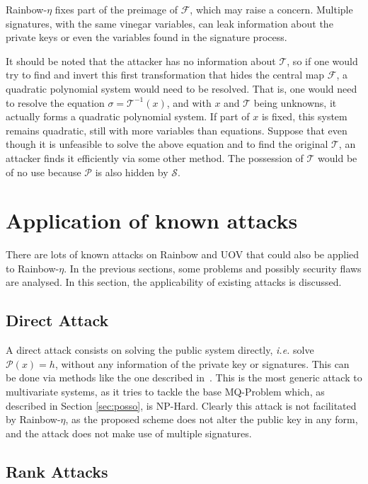 \documentclass{ufsctex/ufsctex}
\begin{document}
Rainbow-$\eta$ fixes part of the preimage of $\mathcal{F}$, which may raise a
concern. Multiple signatures, with the same vinegar variables, can leak
information about the private keys or even the variables found in the signature
process.

It should be noted that the attacker has no information about $\mathcal{T}$, so
if one would try to find and invert this first transformation that hides the
central map $\mathcal{F}$, a quadratic polynomial system would need to be
resolved. That is, one would need to resolve the equation $\sigma =
\mathcal{T}^{-1}(x)$, and with $x$ and $\mathcal{T}$ being unknowns, it
actually forms a quadratic polynomial system. If part of $x$ is fixed, this
system remains quadratic, still with more variables than equations. Suppose
that even though it is unfeasible to solve the above equation and to find the
original $\mathcal{T}$, an attacker finds it efficiently via some other method.
The possession of $\mathcal{T}$ would be of no use because $\mathcal{P}$ is
also hidden by $\mathcal{S}$.

\section{Application of known attacks}

There are lots of known attacks on Rainbow and UOV that could also be applied
to Rainbow-$\eta$. In the previous sections, some problems and possibly
security flaws are analysed. In this section, the applicability of existing
attacks is discussed.

\subsection{Direct Attack}

A direct attack consists on solving the public system directly, \textit{i.e.}
solve $\mathcal{P}(x) = h$, without any information of the private key or
signatures. This can be done via methods like the one described
in~\cite{bettale2009hybrid}. This is the most generic attack to multivariate
systems, as it tries to tackle the base MQ-Problem which, as described in
Section \ref{sec:posso}, is NP-Hard. Clearly this attack is not facilitated by
Rainbow-$\eta$, as the proposed scheme does not alter the public key in any
form, and the attack does not make use of multiple signatures.

\subsection{Rank Attacks}
\end{document}
